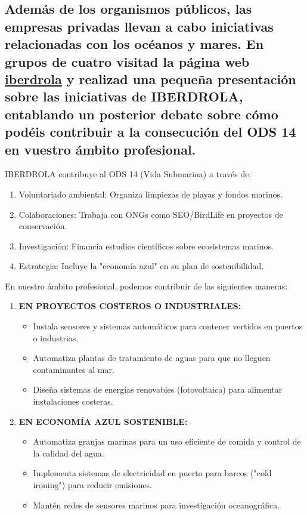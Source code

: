 
\fsection{\boldit{\textcolor{waveBlue2}{Actividad}}} 
\subsection*{Además de los organismos públicos, las empresas privadas llevan a cabo iniciativas relacionadas con los océanos y mares. En grupos de cuatro visitad la página web \href{www.iberdrola.com/sostenibilidad/limpieza-oceanos-iniciativas}{iberdrola}  y realizad una pequeña presentación sobre las iniciativas de IBERDROLA, entablando un posterior debate sobre cómo podéis contribuir a la consecución del ODS 14 en vuestro ámbito profesional.}

\begin{solution}
IBERDROLA contribuye al ODS 14 (Vida Submarina) a través de:
\begin{enumerate}
\item Voluntariado ambiental: Organiza limpiezas de playas y fondos marinos.
\item Colaboraciones: Trabaja con ONGs como SEO/BirdLife en proyectos de conservación.
\item Investigación: Financia estudios científicos sobre ecosistemas marinos.
\item Estrategia: Incluye la "economía azul" en su plan de sostenibilidad.
\end{enumerate}
En nuestro ámbito profesional, podemos contribuir de las siguientes maneras:
\begin{enumerate}
	\item \textbf{EN PROYECTOS COSTEROS O INDUSTRIALES:}
\begin{itemize}
	\item{Instala sensores y sistemas automáticos para contener vertidos en puertos o industrias.}
	\item{Automatiza plantas de tratamiento de aguas para que no lleguen contaminantes al mar.}
	\item{Diseña sistemas de energías renovables (fotovoltaica) para alimentar instalaciones costeras.}
\end{itemize}

\item \textbf{EN ECONOMÍA AZUL SOSTENIBLE:}

\begin{itemize}
	\item{Automatiza granjas marinas para un uso eficiente de comida y control de la calidad del agua.}
	\item{Implementa sistemas de electricidad en puerto para barcos ("cold ironing") para reducir emisiones.}
	\item{Mantén redes de sensores marinos para investigación oceanográfica.}
\end{itemize}


\end{enumerate}
\end{solution}
